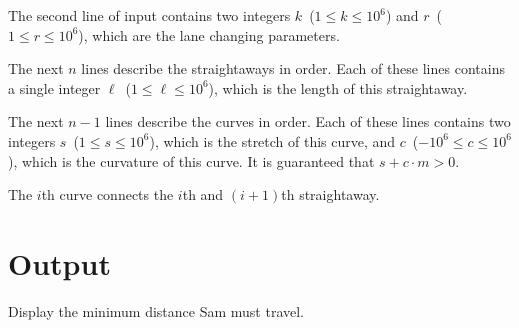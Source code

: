 The second line of input contains two integers
$k$~($1 \leq k \leq 10^6$) and $r$~($1 \leq r \leq 10^6$), which are
the lane changing parameters.



The next $n$ lines describe the straightaways in order. Each of these lines
contains a single integer $\ell$~($1 \leq \ell \leq 10^6$), which is
the length of this straightaway.



The next $n-1$ lines describe the curves in order. Each of these lines contains
two integers $s$~($1 \leq s \leq 10^6$), which is the stretch of
this curve, and $c$~($-10^6 \leq c \leq 10^6$), which is the curvature of
this curve. It is guaranteed that $s + c \cdot m > 0$.

The $i$th curve connects the $i$th and $(i+1)$th straightaway.



\section*{Output}

Display the minimum distance Sam must travel.
